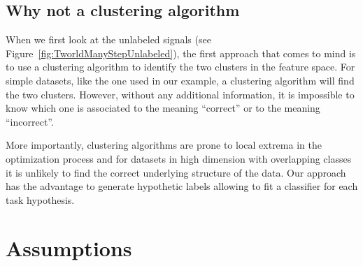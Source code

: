 

\subsection{Why not a clustering algorithm}
\label{chapter:lfui:whynotEM}

When we first look at the unlabeled signals (see Figure~\ref{fig:TworldManyStepUnlabeled}), the first approach that comes to mind is to use a clustering algorithm to identify the two clusters in the feature space. For simple datasets, like the one used in our example, a clustering algorithm will find the two clusters. However, without any additional information, it is impossible to know which one is associated to the meaning ``correct'' or to the meaning ``incorrect''.

More importantly, clustering algorithms are prone to local extrema in the optimization process and for datasets in high dimension with overlapping classes it is unlikely to find the correct underlying structure of the data. Our approach has the advantage to generate hypothetic labels allowing to fit a classifier for each task hypothesis. 


\section{Assumptions}
\label{chapter:lfui:assumptions}


